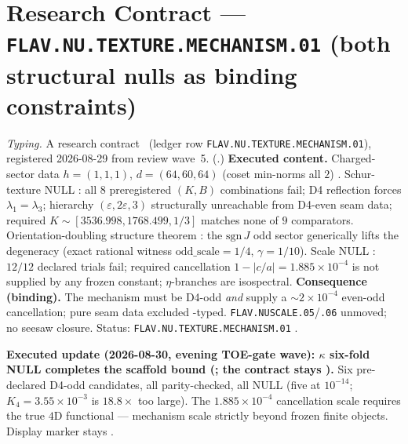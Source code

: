 \documentclass[11pt,a4paper]{article}
\begin{document}
\section*{Research Contract --- \texttt{FLAV.NU.TEXTURE.MECHANISM.01} (both structural nulls as binding constraints)}
\noindent\emph{Typing.} A research contract \mO\ (ledger row
\texttt{FLAV.NU.TEXTURE.MECHANISM.01}), registered 2026-08-29 from review wave~5.
(.)
\textbf{Executed content.}  Charged-sector data $h=(1,1,1)$, $d=(64,60,64)$ (coset min-norms all
$2$) \mE.  Schur-texture NULL \mX: all $8$ preregistered $(K,B)$ combinations fail; D4 reflection
forces $\lambda_1=\lambda_3$; hierarchy $(\varepsilon,2\varepsilon,3)$ structurally unreachable
from D4-even seam data; required $K\sim[3536.998,1768.499,1/3]$ matches none of $9$ comparators.
Orientation-doubling structure theorem \mE: the $\mathrm{sgn}\,J$ odd sector generically lifts
the degeneracy (exact rational witness $\mathrm{odd\_scale}=1/4$, $\gamma=1/10$).  Scale NULL
\mX: $12/12$ declared trials fail; required cancellation $1-\lvert c/a\rvert=1.885{\times}10^{-4}$
is not supplied by any frozen constant; $\eta$-branches are isospectral.
\textbf{Consequence (binding).}  The mechanism must be D4-odd \emph{and} supply a
$\sim2{\times}10^{-4}$ even-odd cancellation; pure seam data excluded \mX-typed.
\texttt{FLAV.NUSCALE.05}/\texttt{.06} unmoved; no seesaw closure.
Status: \texttt{FLAV.NU.TEXTURE.MECHANISM.01} \mO.

\par\smallskip\noindent\textbf{Executed update (2026-08-30, evening TOE-gate wave): $\kappa$ six-fold
NULL completes the scaffold bound
(; the contract stays \mO).}
Six pre-declared D4-odd candidates, all parity-checked, all NULL (five at $10^{-14}$;
$K_4=3.55{\times}10^{-3}$ is $18.8{\times}$ too large).  The $1.885{\times}10^{-4}$ cancellation
scale requires the true $4$D functional --- mechanism scale strictly beyond frozen finite objects.
Display marker stays \mO.
\end{document}
